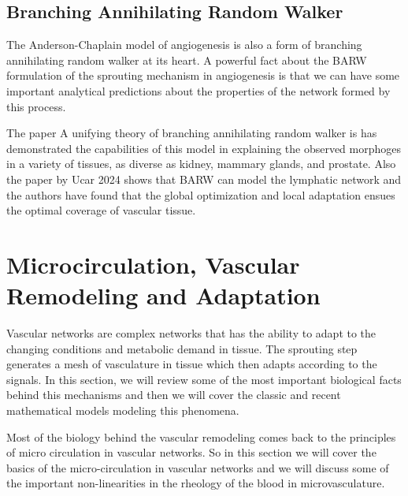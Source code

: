 \documentclass[10pt,a4paper,twocolumn]{article}
\begin{document}
	\subsection{Branching Annihilating Random Walker}
	The Anderson-Chaplain model of angiogenesis is also a form of branching annihilating random walker at its heart. A powerful fact about the BARW formulation of the sprouting mechanism in angiogenesis is that we can have some important analytical predictions about the properties of the network formed by this process.
	
	The paper A unifying theory of branching annihilating random walker is has demonstrated the capabilities of this model in explaining the observed morphoges in a variety of tissues, as diverse as kidney, mammary glands, and prostate. Also the paper by Ucar 2024 shows that BARW can model the lymphatic network and the authors have found that the global optimization and local adaptation ensues the optimal coverage of vascular tissue. 
	
	
	\section{Microcirculation, Vascular Remodeling and Adaptation}
	Vascular networks are complex networks that has the ability to adapt to the changing conditions and metabolic demand in tissue. The sprouting step generates a mesh of vasculature in tissue which then adapts according to the signals. In this section, we will review some of the most important biological facts behind this mechanisms and then we will cover the classic and recent mathematical models modeling this phenomena.
	
	Most of the biology behind the vascular remodeling comes back to the principles of micro circulation in vascular networks. So in this section we will cover the basics of the micro-circulation in vascular networks and we will discuss some of the important non-linearities in the rheology of the blood in microvasculature.
	
\end{document}
